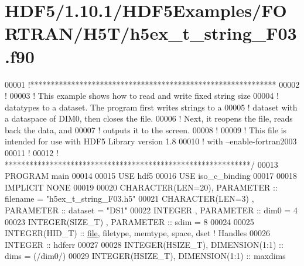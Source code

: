 \hypertarget{_h_d_f5_21_810_81_2_h_d_f5_examples_2_f_o_r_t_r_a_n_2_h5_t_2h5ex__t__string___f03_8f90_source}{}\section{H\+D\+F5/1.10.1/\+H\+D\+F5\+Examples/\+F\+O\+R\+T\+R\+A\+N/\+H5\+T/h5ex\+\_\+t\+\_\+string\+\_\+\+F03.f90}
\label{_h_d_f5_21_810_81_2_h_d_f5_examples_2_f_o_r_t_r_a_n_2_h5_t_2h5ex__t__string___f03_8f90_source}

\begin{DoxyCode}
00001 \textcolor{comment}{!************************************************************}
00002 \textcolor{comment}{!}
00003 \textcolor{comment}{!  This example shows how to read and write fixed string size}
00004 \textcolor{comment}{!  datatypes to a dataset.  The program first writes strings to a}
00005 \textcolor{comment}{!  dataset with a dataspace of DIM0, then closes the file.}
00006 \textcolor{comment}{!  Next, it reopens the file, reads back the data, and}
00007 \textcolor{comment}{!  outputs it to the screen.}
00008 \textcolor{comment}{!}
00009 \textcolor{comment}{!  This file is intended for use with HDF5 Library version 1.8}
00010 \textcolor{comment}{!  with --enable-fortran2003 }
00011 \textcolor{comment}{!}
00012 \textcolor{comment}{! ************************************************************/}
00013 \textcolor{keyword}{PROGRAM} main
00014 
00015   \textcolor{keywordtype}{USE }hdf5
00016   \textcolor{keywordtype}{USE }iso\_c\_binding
00017 
00018   \textcolor{keywordtype}{IMPLICIT NONE}
00019 
00020   \textcolor{keywordtype}{CHARACTER(LEN=20)}, \textcolor{keywordtype}{PARAMETER} :: filename  = \textcolor{stringliteral}{"h5ex\_t\_string\_F03.h5"}
00021   \textcolor{keywordtype}{CHARACTER(LEN=3)} , \textcolor{keywordtype}{PARAMETER} :: dataset   = \textcolor{stringliteral}{"DS1"}
00022   \textcolor{keywordtype}{INTEGER}          , \textcolor{keywordtype}{PARAMETER} :: dim0      = 4
00023   \textcolor{keywordtype}{INTEGER(SIZE\_T)}  , \textcolor{keywordtype}{PARAMETER} :: sdim      = 8 
00024 
00025   \textcolor{keywordtype}{INTEGER(HID\_T)}  :: \hyperlink{structfile}{file}, filetype, memtype, space, dset \textcolor{comment}{! Handles}
00026   \textcolor{keywordtype}{INTEGER} :: hdferr
00027 
00028   \textcolor{keywordtype}{INTEGER(HSIZE\_T)}, \textcolor{keywordtype}{DIMENSION(1:1)} :: dims = (/dim0/)
00029   \textcolor{keywordtype}{INTEGER(HSIZE\_T)}, \textcolor{keywordtype}{DIMENSION(1:1)} :: maxdims

\end{DoxyCode}
